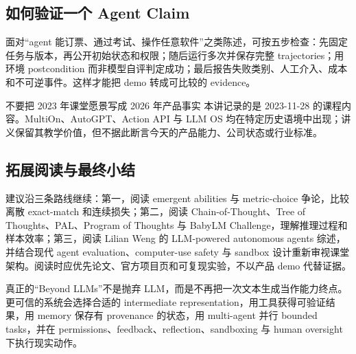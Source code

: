 \documentclass[a4paper]{article}
\begin{document}
\subsection{如何验证一个 Agent Claim}

面对“agent 能订票、通过考试、操作任意软件”之类陈述，可按五步检查：先固定任务与版本，再公开初始状态和权限；随后运行多次并保存完整 trajectories；用环境 postcondition 而非模型自评判定成功；最后报告失败类别、人工介入、成本和不可逆事件。这样才能把 demo 转成可比较的 evidence。

\begin{warningbox}{不要把 2023 年课堂愿景写成 2026 年产品事实}
本讲记录的是 2023-11-28 的课程内容。MultiOn、AutoGPT、Action API 与 LLM OS 均在特定历史语境中出现；讲义保留其教学价值，但不据此断言今天的产品能力、公司状态或行业标准。
\end{warningbox}

\subsection{拓展阅读与最终小结}

\enlargethispage{5\baselineskip}

建议沿三条路线继续：第一，阅读 emergent abilities 与 metric-choice 争论，比较离散 exact-match 和连续损失；第二，阅读 Chain-of-Thought、Tree of Thoughts、PAL、Program of Thoughts 与 BabyLM Challenge，理解推理过程和样本效率；第三，阅读 Lilian Weng 的 LLM-powered autonomous agents 综述，并结合现代 agent evaluation、computer-use safety 与 sandbox 设计重新审视课堂架构。阅读时应优先论文、官方项目页和可复现实验，不以产品 demo 代替证据。

真正的“Beyond LLMs”不是抛弃 LLM，而是不再把一次文本生成当作能力终点。更可信的系统会选择合适的 intermediate representation，用工具获得可验证结果，用 memory 保存有 provenance 的状态，用 multi-agent 并行 bounded tasks，并在 permissions、feedback、reflection、sandboxing 与 human oversight 下执行现实动作。
\end{document}
